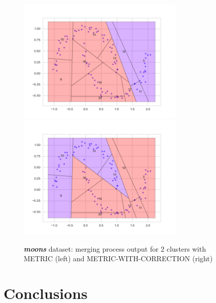 \documentclass[a4paper]{article}
\begin{document}
\begin{figure}[H]
\centering
\includegraphics[width=8cm]{grafici/moons_2clusters_nocorr.png}
\includegraphics[width=8cm]{grafici/moons_2clusters_withcorr.png}
\caption{\emph{\textbf{moons}} dataset: merging process output for 2 clusters with METRIC (left) and METRIC-WITH-CORRECTION (right)}
\label{2vs3}
\end{figure} 




\section{Conclusions}
\end{document}
